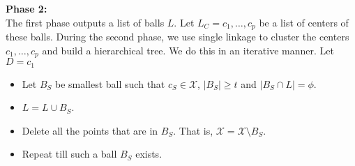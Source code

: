 \documentclass[11pt]{article}
\begin{document}
\noindent \textbf{Phase 2:}\\ The first phase outputs a list of balls $L$. Let $L_C = c_1,\ldots,c_p$ be a list of centers of these balls. During the second phase, we use single linkage to cluster the centers $c_1,\ldots,c_p$ and build a hierarchical tree. We do this in an iterative manner. Let $D = c_1$
\begin{itemize}
\item Let $B_S$ be smallest ball such that $c_S \in \mathcal{X}$, $|B_S| \ge t$  and $|B_S \cap L | = \phi$.
\item $L = L \cup B_S$.
\item Delete all the points that are in $B_S$. That is, $\mathcal{X} = \mathcal{X}\setminus B_S$.
\item Repeat till such a ball $B_S$ exists.
\end{itemize}
\end{document}
